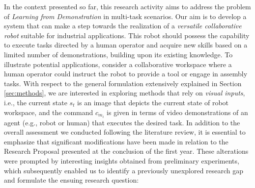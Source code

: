 In the context presented so far, this research activity aims to address the problem of \textit{Learning from Demonstration} in multi-task scenarios. Our aim is to develop a system that can make a step towards the realization of a \textit{versatile collaborative robot} suitable for industrial applications. This robot should possess the capability to execute tasks directed by a human operator and acquire new skills based on a limited number of demonstrations, building upon its existing knowledge. To illustrate potential applications, consider a collaborative workspace where a human operator could instruct the robot to provide a tool or engage in assembly tasks. With respect to the general formulation extensively explained in Section \ref{sec:methods}, we are interested in exploring methods that rely on \textit{visual inputs}, i.e., the current state $s_{t}$ is an image that depicts the current state of robot workspace, and the command $c_{m_{i}}$ is given in terms of video demonstrations of an agent (e.g., robot or human) that executes the desired task.
\newline In addition to the overall assessment we conducted following the literature review, it is essential to emphasize that significant modifications have been made in relation to the Research Proposal presented at the conclusion of the first year. These alterations were prompted by interesting insights obtained from preliminary experiments, which subsequently enabled us to identify a previously unexplored research gap and formulate the ensuing research question:
